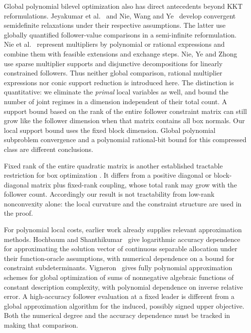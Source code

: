 Global polynomial bilevel optimization also has direct antecedents beyond
KKT reformulations. Jeyakumar et al.~\cite{JeyakumarEtAl2016} and
Nie, Wang and Ye~\cite{NieWangYe2017} develop convergent semidefinite
relaxations under their respective assumptions. The latter use globally
quantified follower-value comparisons in a semi-infinite reformulation.
Nie et al.~\cite{NieEtAl2021} represent multipliers by polynomial or rational
expressions and combine them with feasible extensions and exchange steps.
Nie, Ye and Zhong~\cite{NieYeZhong2026} use sparse multiplier supports and
disjunctive decompositions for linearly constrained followers. Thus neither
global comparison, rational multiplier expressions nor conic support reduction
is introduced here. The distinction is quantitative: we eliminate the
\emph{primal} local variables as well, and bound the number of joint regimes
in a dimension independent of their total count. A support bound based on the
rank of the entire follower constraint matrix can still grow like the follower
dimension when that matrix contains all box normals. Our local support bound
uses the fixed block dimension. Global polynomial subproblem convergence and
a polynomial rational-bit bound for this compressed class are different
conclusions.

Fixed rank of the entire quadratic matrix is another established tractable
restriction for box optimization \cite{HladikCernyRada2021}. It differs from a
positive diagonal or block-diagonal matrix plus fixed-rank coupling, whose
total rank may grow with the follower count. Accordingly our result is not
tractability from low-rank nonconvexity alone: the local curvature and the
constraint structure are used in the proof.

For polynomial local costs, earlier work already supplies relevant
approximation methods. Hochbaum and Shanthikumar~\cite{HochbaumShanthikumar1990}
give logarithmic accuracy dependence for approximating the solution vector
of continuous separable allocation under their function-oracle assumptions,
with numerical dependence on a bound for constraint subdeterminants.
Vigneron~\cite{Vigneron2014} gives fully polynomial approximation schemes
for global optimization of sums of nonnegative algebraic functions of
constant description complexity, with polynomial dependence on inverse
relative error. A high-accuracy follower evaluation at a
fixed leader is different from a global approximation algorithm for the
induced, possibly signed upper objective. Both the numerical degree and
the accuracy dependence must be tracked in making that comparison.

